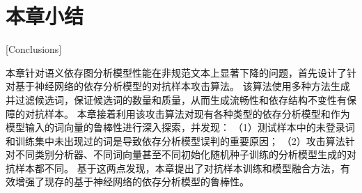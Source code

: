 \section{本章小结}[Conclusions]

本章针对语义依存图分析模型性能在非规范文本上显著下降的问题，首先设计了针对基于神经网络的依存分析模型的对抗样本攻击算法。
该算法使用多种方法生成并过滤候选词，保证候选词的数量和质量，从而生成流畅性和依存结构不变性有保障的对抗样本。
本章接着利用该攻击算法对现有各种类型的依存分析模型和作为模型输入的词向量的鲁棒性进行深入探索，并发现：
（1）测试样本中的未登录词和训练集中未出现过的词是导致依存分析模型误判的重要原因；
（2）攻击算法针对不同类别分析器、不同词向量甚至不同初始化随机种子训练的分析模型生成的对抗样本都不同。
基于这两点发现，本章提出了对抗样本训练和模型融合方法，有效增强了现存的基于神经网络的依存分析模型的鲁棒性。

